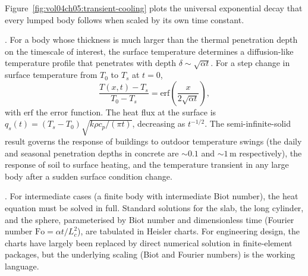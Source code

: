 

Figure~\ref{fig:vol04ch05:transient-cooling} plots the universal
exponential decay that every lumped body follows when scaled by its own
time constant.

. For a body
whose thickness is much larger than the thermal penetration depth on
the timescale of interest, the surface temperature determines a
diffusion-like temperature profile that penetrates with depth $\delta
\sim \sqrt{\alpha t}$. For a step change in surface temperature from
$T_0$ to $T_s$ at $t = 0$,
\[
\frac{T(x, t) - T_s}{T_0 - T_s} = \text{erf}\left(\frac{x}{2\sqrt{
\alpha t}}\right),
\]
with $\text{erf}$ the error function. The heat flux at the surface
is $q_s(t) = (T_s - T_0) \sqrt{k \rho c_p/(\pi t)}$, decreasing as
$t^{-1/2}$. The semi-infinite-solid result governs the response of
buildings to outdoor temperature swings (the daily and seasonal
penetration depths in concrete are $\sim 0.1$ and $\sim 1\,\text{m}$
respectively), the response of soil to surface heating, and the
temperature transient in any large body after a sudden surface
condition change.

.
For intermediate cases (a finite body with intermediate Biot number),
the heat equation must be solved in full. Standard solutions for the
slab, the long cylinder, and the sphere, parameterised by Biot
number and dimensionless time (Fourier number $\text{Fo} = \alpha
t/L_c^2$), are tabulated in Heisler charts. For engineering design,
the charts have largely been replaced by direct numerical solution
in finite-element packages, but the underlying scaling (Biot and
Fourier numbers) is the working language.

